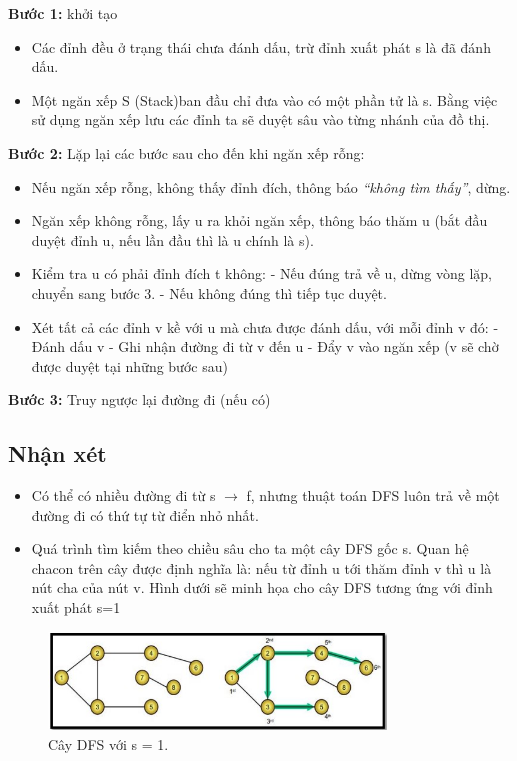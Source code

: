 \textbf{Bước 1:} khởi tạo
\begin{itemize}
	\item Các đỉnh đều ở trạng thái chưa đánh dấu, trừ đỉnh xuất phát s là đã đánh
	dấu.
	\item Một ngăn xếp S (Stack)ban đầu chỉ đưa vào có một phần tử là s. Bằng việc
	sử dụng ngăn xếp lưu các đỉnh ta sẽ duyệt sâu vào từng nhánh của đồ thị.
\end{itemize}

\textbf{Bước 2:} Lặp lại các bước sau cho đến khi ngăn xếp rỗng:
\begin{itemize}
	\item Nếu ngăn xếp rỗng, không thấy đỉnh đích, thông báo \textit{“không tìm thấy”},
	dừng.
	\item Ngăn xếp không rỗng, lấy u ra khỏi ngăn xếp, thông báo thăm u (bắt đầu
	duyệt đỉnh u, nếu lần đầu thì là u chính là s).
	\item Kiểm tra u có phải đỉnh đích t không:
		\subitem - Nếu đúng trả về u, dừng vòng lặp, chuyển sang bước 3.
		\subitem - Nếu không đúng thì tiếp tục duyệt.
	\item Xét tất cả các đỉnh v kề với u mà chưa được đánh dấu, với mỗi đỉnh v đó:
		\subitem - Đánh dấu v
		\subitem - Ghi nhận đường đi từ v đến u
		\subitem - Đẩy v vào ngăn xếp (v sẽ chờ được duyệt tại những bước sau)
\end{itemize}

\textbf{Bước 3:} Truy ngược lại đường đi (nếu có)

\subsection{Nhận xét}
\begin{itemize}
	\item Có thể có nhiều đường đi từ s $\to$ f, nhưng thuật toán DFS luôn trả về một
	đường đi có thứ tự từ điển nhỏ nhất.
	\item Quá trình tìm kiếm theo chiều sâu cho ta một cây DFS gốc s. Quan hệ chacon trên cây được định nghĩa là: nếu từ đỉnh u tới thăm đỉnh v thì u là nút
	cha của nút v. Hình dưới sẽ minh họa cho cây DFS tương ứng với đỉnh xuất
	phát s=1
\end{itemize}

\begin{figure}[h!]
	\centering
	\includegraphics[width=0.8\textwidth]{
		Figures/figs/cayDFS_S1.jpg
	}
	\caption[Cây DFS với s = 1.]{
		Cây DFS với s = 1.
	}
	\label{fig:hinhb}
\end{figure}

